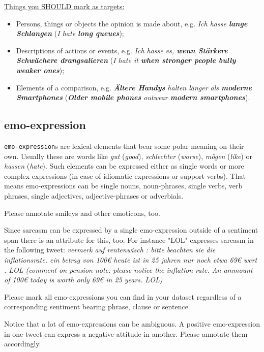 \documentclass[11pt,a4paper]{article}
\begin{document}
\underline{Things you SHOULD mark as targets:}
\begin{itemize}
  \item Persons, things or objects the opinion is made about,
    e.g. \textit{Ich hasse \textbf{lange Schlangen}} (\textit{I hate
      \textbf{long queues}});

  \item Descriptions of actions or events, e.g. \textit{Ich hasse es,
    \textbf{wenn St\"arkere Schw\"achere drangsalieren}} (\textit{I
    hate it \textbf{when stronger people bully weaker ones}});

  \item Elements of a comparison,
    e.g. \textit{\textbf{\"Altere Handys} halten l\"anger als
      \textbf{moderne Smartphones}} (\textit{\textbf{Older mobile
        phones} outwear \textbf{modern smartphones}}).
\end{itemize}

\subsection{emo-expression}
\texttt{emo-expression}s are lexical elements that bear some
polar meaning on their own. Usually these are words like
\textit{gut} (\textit{good}), \textit{schlechter} (\textit{worse}),
\textit{m\"ogen} (\textit{like}) or \textit{hassen}
(\textit{hate}). Such elements can be expressed either as single words
or more complex expressions (in case of idiomatic expressions or support
verbs). That means emo-expressions can be single nouns, noun-phrases, single 
verbs, verb phrases, single adjectives, adjective-phrases or adverbials. 

Please annotate smileys and other emoticons, too.

Since sarcasm can be expressed by a single emo-expression outside of a sentiment span there is an attribute for this, too. 
For instance "LOL" expresses sarcasm in the following tweet: \textit{vermerk auf rentenwisch : 
bitte beachten sie die inflationsrate. ein betrag von {100\euro} heute ist in 25  jahren nur noch etwa {69\euro} wert . LOL (comment on pension note:
please notice the inflation rate. An ammount of {100\euro} today is worth only {69\euro} in 25 years. LOL)}

Please mark all emo-expressions you can find in your dataset regardless of a corresponding sentiment bearing phrase, clause or sentence. 

Notice that a lot of emo-expressions can be ambiguous. A positive emo-expression in one tweet can express a negative attitude in another. Please annotate them accordingly.
\end{document}
